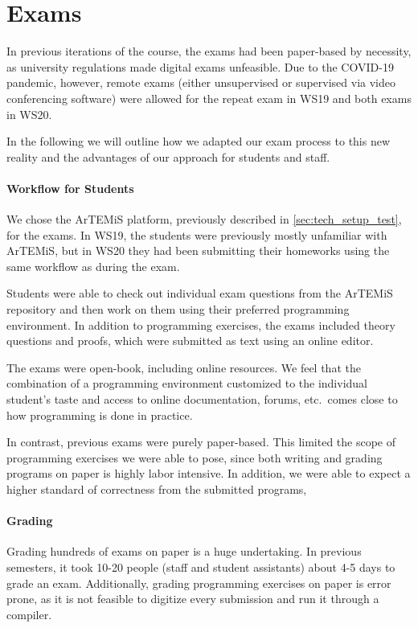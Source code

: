 \section{Exams}\label{sec:exam}
In previous iterations of the course, the exams had been paper-based by necessity, as university regulations made digital exams unfeasible. Due to the COVID-19 pandemic, however, remote exams (either unsupervised or supervised via video conferencing software) were allowed for the repeat exam in WS19 and both exams in WS20.

In the following we will outline how we adapted our exam process to this new reality and the advantages of our approach for students and staff.

\paragraph{Workflow for Students}

We chose the ArTEMiS \cite{artemis} platform, previously described in \cref{sec:tech_setup_test}, for the exams. In WS19, the students were previously mostly unfamiliar with ArTEMiS, but in WS20 they had been submitting their homeworks using the same workflow as during the exam.

Students were able to check out individual exam questions from the ArTEMiS repository and then work on them using their preferred programming environment. In addition to programming exercises, the exams included theory questions and proofs, which were submitted as text using an online editor.

The exams were open-book, including online resources. We feel that the combination of a programming environment customized to the individual student's taste and access to online documentation, forums, etc.~comes close to how programming is done in practice. 

In contrast, previous exams were purely paper-based. This limited the scope of programming exercises we were able to pose, since both writing and grading programs on paper is highly labor intensive. In addition, we were able to expect a higher standard of correctness from the submitted programs,

\paragraph{Grading}
Grading hundreds of exams on paper is a huge undertaking. In previous semesters, it took 10-20 people (staff and student assistants) about 4-5 days  to grade an exam. Additionally, grading programming exercises on paper is error prone, as it is not feasible to digitize every submission and run it through a compiler.

